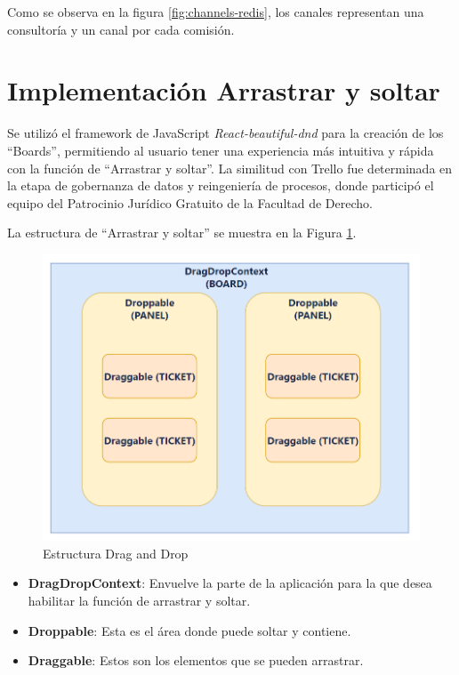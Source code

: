 Como se observa en la figura \ref{fig:channels-redis}, los canales representan una consultoría y un canal por cada comisión.


\section{Implementación Arrastrar y soltar}
Se utilizó el framework de JavaScript \textit{React-beautiful-dnd} para la creación de los ``Boards'', permitiendo al usuario tener una experiencia más intuitiva y rápida con la función de ``Arrastrar y soltar''. La similitud con Trello fue determinada en la etapa de gobernanza de datos y reingeniería de procesos, donde participó el equipo del Patrocinio Jurídico Gratuito de la Facultad de Derecho.

La estructura de ``Arrastrar y soltar'' se muestra en la Figura \ref{fig:drag-drop}.

\begin{figure}[H] \centering \includegraphics[width=1\linewidth]{fig/drag-drop.png} \caption{Estructura Drag and Drop} \label{fig:drag-drop} \end{figure}

\begin{itemize}
    \item \textbf{DragDropContext}: Envuelve la parte de la aplicación para la que desea habilitar la función de arrastrar y soltar.
    \item \textbf{Droppable}: Esta es el área donde puede soltar y contiene.
    \item \textbf{Draggable}: Estos son los elementos que se pueden arrastrar.
\end{itemize}


